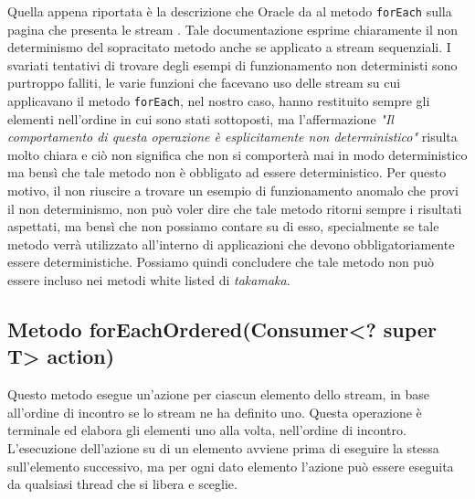 			Quella appena riportata è la descrizione che Oracle da al metodo \lstinline|forEach| sulla pagina che presenta le stream \cite{oracle-util-stream}. Tale documentazione esprime chiaramente il non determinismo del sopracitato metodo anche se applicato a stream sequenziali. I svariati tentativi di trovare degli esempi di funzionamento non deterministi sono purtroppo falliti, le varie funzioni che facevano uso delle stream su cui applicavano il metodo \lstinline|forEach|, nel nostro caso, hanno restituito sempre gli elementi nell'ordine in cui sono stati sottoposti, ma l'affermazione \textit{"Il comportamento di questa operazione è esplicitamente non deterministico"} risulta molto chiara e ciò non significa che non si comporterà mai in modo deterministico ma bensì che tale metodo non è obbligato ad essere deterministico. Per questo motivo, il non riuscire a trovare un esempio di funzionamento anomalo che provi il non determinismo, non può voler dire che tale metodo ritorni sempre i risultati aspettati, ma bensì che non possiamo contare su di esso, specialmente se tale metodo verrà utilizzato all'interno di applicazioni che devono obbligatoriamente essere deterministiche. Possiamo quindi concludere che tale metodo non può essere incluso nei metodi white listed di \textit{takamaka}.
			
		\subsection{Metodo forEachOrdered(Consumer<? super T> action)}
			Questo metodo esegue un'azione per ciascun elemento dello stream, in base all'ordine di incontro se lo stream ne ha definito uno. Questa operazione è terminale ed elabora gli elementi uno alla volta, nell'ordine di incontro. L'esecuzione dell'azione su di un elemento avviene prima di eseguire la stessa sull'elemento successivo, ma per ogni dato elemento l'azione può essere eseguita da qualsiasi thread che si libera e sceglie.
			
